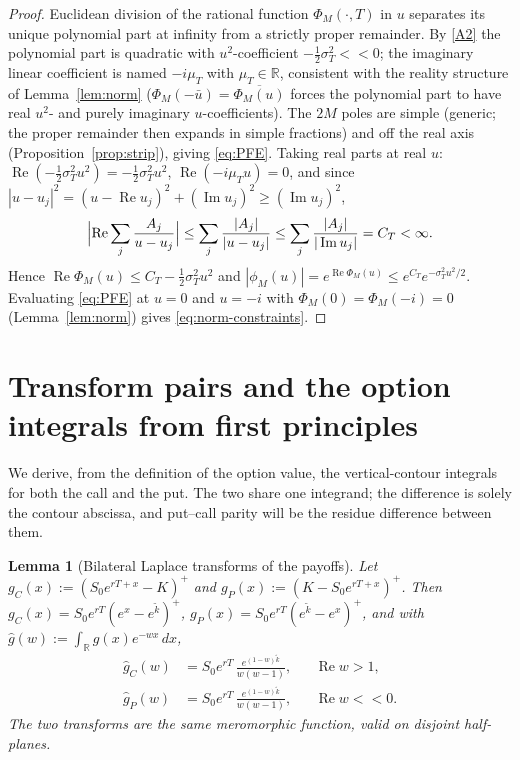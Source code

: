 \documentclass[11pt]{article}
\newtheorem{lemma}[theorem]{Lemma}
\newcommand{\R}{\mathbb{R}}
\DeclareMathOperator{\Real}{Re}
\DeclareMathOperator{\Imag}{Im}
\begin{document}
\begin{proof}
Euclidean division of the rational function $\Phi_M(\cdot,T)$ in $u$
separates its unique polynomial part at infinity from a strictly proper
remainder. By \ref{A2} the polynomial part is quadratic with $u^2$-coefficient
$-\tfrac12\sigma_T^2<<0$; the imaginary linear coefficient is named $-i\mu_T$
with $\mu_T\in\R$, consistent with the reality structure of
Lemma~\ref{lem:norm} ($\Phi_M(-\bar u)=\overline{\Phi_M(u)}$ forces the
polynomial part to have real $u^2$- and purely imaginary $u$-coefficients).
The $2M$ poles are simple (generic; the proper remainder then expands in
simple fractions) and off the real axis (Proposition~\ref{prop:strip}),
giving \eqref{eq:PFE}. Taking real parts at real $u$:
$\Real(-\tfrac12\sigma_T^2u^2)=-\tfrac12\sigma_T^2u^2$,
$\Real(-i\mu_T u)=0$, and since
$|u-u_j|^2=(u-\Real u_j)^2+(\Imag u_j)^2\ge(\Imag u_j)^2$,
\begin{equation}\label{eq:decay-pf}
\Bigl|\Real\sum_j\frac{A_j}{u-u_j}\Bigr|
\le\sum_j\frac{|A_j|}{|u-u_j|}
\le\sum_j\frac{|A_j|}{|\Imag u_j|}=C_T<\infty .
\end{equation}
Hence $\Real\Phi_M(u)\le C_T-\tfrac12\sigma_T^2u^2$ and
$|\phi_M(u)|=e^{\Real\Phi_M(u)}\le e^{C_T}e^{-\sigma_T^2u^2/2}$. Evaluating
\eqref{eq:PFE} at $u=0$ and $u=-i$ with $\Phi_M(0)=\Phi_M(-i)=0$
(Lemma~\ref{lem:norm}) gives \eqref{eq:norm-constraints}.
\end{proof}

\section{Transform pairs and the option integrals from first principles}
\label{sec:transform}

We derive, from the definition of the option value, the vertical-contour
integrals for both the call and the put. The two share one integrand; the
difference is solely the contour abscissa, and put--call parity will be the
residue difference between them.

\begin{lemma}[Bilateral Laplace transforms of the payoffs]\label{lem:payoff}
Let $g_C(x):=(S_0e^{rT+x}-K)^{+}$ and $g_P(x):=(K-S_0e^{rT+x})^{+}$. Then
$g_C(x)=S_0e^{rT}(e^x-e^{\tilde k})^{+}$, $g_P(x)=S_0e^{rT}(e^{\tilde k}-e^x)^{+}$,
and with $\hat g(w):=\int_\R g(x)e^{-wx}\,dx$,
\begin{align}
\hat g_C(w)&=S_0e^{rT}\,\frac{e^{(1-w)\tilde k}}{w(w-1)},
&&\Real w>1,\label{eq:gChat}\\
\hat g_P(w)&=S_0e^{rT}\,\frac{e^{(1-w)\tilde k}}{w(w-1)},
&&\Real w<<0.\label{eq:gPhat}
\end{align}
The two transforms are the same meromorphic function, valid on disjoint
half-planes.
\end{lemma}
\end{document}
